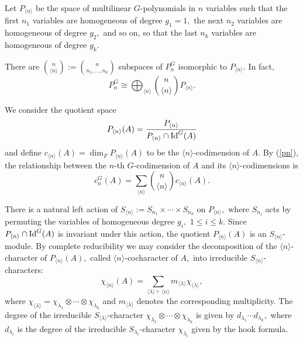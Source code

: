 \documentclass{amsart}
\newcommand{\Idg}{\ensuremath{\textnormal{Id}^{G}}}
\newcommand{\spam}{\ensuremath{\textnormal{span}}}
\numberwithin{equation}{section}
\begin{document}
Let $P_{\langle n \rangle}$ be the space of multilinear $G$-polynomials in $n$ variables such that the first $n_1$ variables are homogeneous of degree $g_1=1,$ the next $n_2$ variables are homogeneous of degree $g_2,$ and so on, so that the last $n_{k}$ variables are homogeneous of degree $g_k.$ 

There are $\displaystyle\binom{n}{\langle n \rangle}:=\displaystyle\binom{n}{ n_1, \ldots, n_{k} }$ subspaces of $P_n^G$ isomorphic to $P_{\langle n \rangle}$. In fact, 
\begin{equation} \label{pn}
P_n^{G} \cong \displaystyle \bigoplus_{\langle n \rangle } \displaystyle\binom{n}{\langle n \rangle} P_{\langle n \rangle} .
\end{equation}









We consider the quotient space $$P_{\langle n \rangle}(A) = \frac{P_{\langle n \rangle}}{P_{\langle n \rangle}\cap \Idg(A)}$$ and define $c_{\langle n \rangle}(A)=\dim_F P_{\langle n \rangle}(A)$ to be the $\langle n \rangle $-codimension of $A$. 
By (\ref{pn}), the relationship between the $n$-th $G$-codimension of $A$ and its $\langle n \rangle $-codimensions is 
\begin{equation} \label{293}
		c_n^{G}(A)= \underset{\langle n \rangle }{\sum} \displaystyle\binom{n}{\langle n \rangle } c_{\langle n \rangle}(A). 
	\end{equation}


There is a natural left action of $S_{\langle n \rangle}:= S_{n_1}\times\cdots \times S_{n_{k}}$ on $P_{\langle n \rangle},$ where $S_{n_i}$ acts by permuting
the variables of homogeneous degree $g_i,$ $1\le i \le k.$  Since $P_{\langle n \rangle} \cap \Idg(A)$ is invariant under this
action, the quotient $P_{\langle n \rangle}(A)$ is an $S_{\langle n \rangle}$-module. By complete reducibility we may consider the decomposition of the $\langle n \rangle$-character of $P_{\langle n \rangle}(A),$ called $\langle n \rangle$-cocharacter of $A,$ into irreducible $S_{\langle n \rangle}$-characters: 
\begin{equation}\label{eq1coca}\chi_{\langle n \rangle}(A)=\sum\limits_{\langle \lambda \rangle \vdash \langle n \rangle} m_{\langle \lambda \rangle} \chi_{\langle \lambda \rangle},\end{equation}
where $\chi_{\langle \lambda \rangle}=\chi_{\lambda_1} \otimes\cdots \otimes \chi_{\lambda_{k}}$ and $m_{\langle \lambda \rangle}$  denotes the corresponding multiplicity.  The degree of the irreducible $S_{\langle \lambda \rangle}$-character $\chi_{\lambda_1} \otimes\cdots \otimes \chi_{\lambda_{k}}$ is given by $d_{\lambda_1}\cdots d_{\lambda_k},$ where $d_{\lambda_i}$ is the degree of the irreducible $S_{\lambda_i}$-character $\chi_{\lambda_i}$ given by the hook formula.
\end{document}
